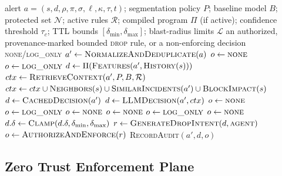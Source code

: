 \documentclass[final,5p]{elsarticle}
\begin{document}
\begin{algorithm}[!htbp]
\caption{Fail-closed bounded-isolation decision}
\label{alg:decision}
\small
\begin{algorithmic}[1]
\Require alert $a=(s,d,\rho,\pi,\sigma,\ell,\kappa,\tau,t)$; segmentation policy $P$; baseline model $B$; protected set $\mathcal{N}$; active rules $\mathcal{R}$; compiled program $\Pi$ (if active); confidence threshold $\tau_c$; TTL bounds $[\delta_{\min},\delta_{\max}]$; blast-radius limits $\mathcal{L}$
\Ensure an authorized, provenance-marked bounded \textsc{drop} rule, or a non-enforcing decision \textsc{none}/\textsc{log\_only}
\State $a' \gets \textsc{NormalizeAndDeduplicate}(a)$
    \State $o \gets \textsc{none}$
    \State $o \gets \textsc{log\_only}$
\Else
    \State $d \gets \Pi(\textsc{Features}(a',\textsc{History}(s)))$ 
     
        \State $ctx \gets \textsc{RetrieveContext}(a',P,B,\mathcal{R})$
        \State $ctx \gets ctx \cup \textsc{Neighbors}(s) \cup \textsc{SimilarIncidents}(a') \cup \textsc{BlockImpact}(s)$
            \State $d \gets \textsc{CachedDecision}(a')$
        \Else
            \State $d \gets \textsc{LLMDecision}(a',ctx)$
        \EndIf
    \EndIf
        \State $o \gets \textsc{none}$
        \State $o \gets \textsc{log\_only}$
        \State $o \gets \textsc{none}$
        \State $o \gets \textsc{none}$
        \State $o \gets \textsc{log\_only}$
        \State $o \gets \textsc{none}$
    \Else
        \State $d.\delta \gets \textsc{Clamp}(d.\delta,\delta_{\min},\delta_{\max})$
        \State $r \gets \textsc{GenerateDropIntent}(d,\textsc{agent})$
        \State $o \gets \textsc{AuthorizeAndEnforce}(r)$
    \EndIf
\EndIf
\State \textsc{RecordAudit}$(a',d,o)$
\end{algorithmic}
\end{algorithm}

\subsection{Zero Trust Enforcement Plane}
\label{sec:enforcement_plane}
\end{document}
